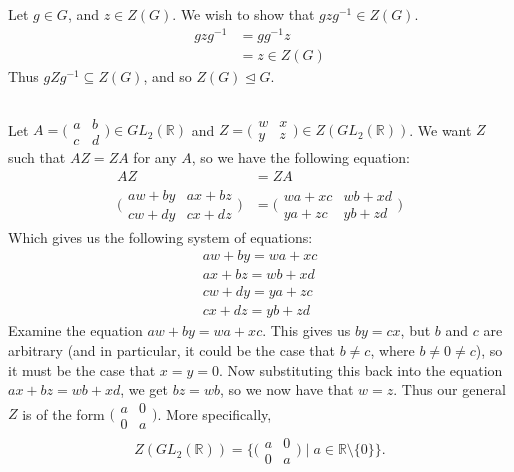 \documentclass[11pt]{article}
\begin{document}
\section{} %
\subsection{} %
Let $g\in G$, and $z\in Z(G)$. We wish to show that $gzg^{-1}\in Z(G)$.
\begin{align*}
	gzg^{-1}&=gg^{-1}z\\
	&=z\in Z(G)
\end{align*}
Thus $gZg^{-1}\subseteq Z(G)$, and so $Z(G)\trianglelefteq G$.


\subsection{} %
Let $A=\bigl(\begin{smallmatrix} a & b\\ c & d \end{smallmatrix}\bigr)\in GL_2(\mathbb{R})$
and $Z=\bigl(\begin{smallmatrix} w & x\\ y & z \end{smallmatrix}\bigr)\in Z(GL_2(\mathbb{R}))$.
We want $Z$ such that $AZ=ZA$ for any $A$, so we have the following equation:
\begin{align*}
	AZ&=ZA\\
	\bigl(\begin{smallmatrix}aw+by & ax+bz\\ cw+dy & cx+dz \end{smallmatrix}\bigr)
		&=\bigl(\begin{smallmatrix}wa+xc & wb+xd\\ ya+zc & yb+zd \end{smallmatrix}\bigr)
\end{align*}
Which gives us the following system of equations:
\begin{align*}
	aw+by=wa+xc\\
	ax+bz=wb+xd\\
	cw+dy=ya+zc\\
	cx+dz=yb+zd
\end{align*}
Examine the equation $aw+by=wa+xc$. This gives us $by=cx$, but $b$ and $c$ are
arbitrary (and in particular, it could be the case that $b\neq c$, where $b\neq0\neq c$),
so it must be the case that $x=y=0$. Now substituting this back into
the equation $ax+bz=wb+xd$, we get $bz=wb$, so we now have that $w=z$. Thus our
general $Z$ is of the form $\bigl(\begin{smallmatrix}a & 0\\ 0 & a\end{smallmatrix}\bigr)$.
More specifically,
\begin{align*}
Z(GL_2(\mathbb{R}))=\{\bigl(\begin{smallmatrix}a & 0\\ 0 & a\end{smallmatrix}\bigr)\mid a\in\mathbb{R}\setminus\{0\}\}.
\end{align*}
\end{document}
